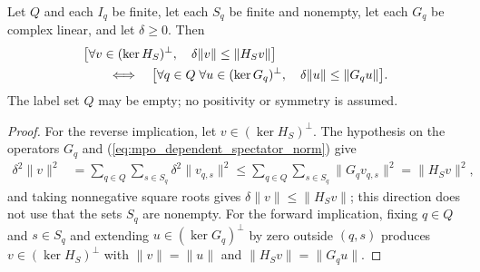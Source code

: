 \begin{lemma}
    \label{thm:mpo_dependent_spectator_gap_iff}
    \leanok
    Let $Q$ and each $I_q$ be finite, let each $S_q$ be finite and nonempty,
    let each $G_q$ be complex linear, and let $\delta\geq0$.  Then
    \begin{align}
         & \bigl[\forall v\in(\ker H_S)^\perp,\quad
        \delta\|v\|\leq\|H_Sv\|\bigr]\notag         \\
         & \qquad\Longleftrightarrow\quad
        \bigl[\forall q\in Q\;\forall u\in(\ker G_q)^\perp,\quad
            \delta\|u\|\leq\|G_qu\|\bigr].
    \end{align}
    The label set $Q$ may be empty; no positivity or symmetry is assumed.
\end{lemma}
\begin{proof}
    \leanok
    For the reverse implication, let $v\in(\ker H_S)^\perp$.  The hypothesis
    on the operators $G_q$ and (\ref{eq:mpo_dependent_spectator_norm}) give
    \begin{align}
        \delta^2\|v\|^2
         & =\sum_{q\in Q}\sum_{s\in S_q}\delta^2\|v_{q,s}\|^2
        \leq\sum_{q\in Q}\sum_{s\in S_q}\|G_qv_{q,s}\|^2
        =\|H_Sv\|^2,
    \end{align}
    and taking nonnegative square roots gives $\delta\|v\|\leq\|H_Sv\|$;
    this direction does not use that the sets $S_q$ are nonempty.
    For the forward implication, fixing $q\in Q$ and
    $s\in S_q$ and extending $u\in(\ker G_q)^\perp$ by zero outside
    $(q,s)$ produces $v\in(\ker H_S)^\perp$ with $\|v\|=\|u\|$ and
    $\|H_Sv\|=\|G_qu\|$.
\end{proof}

